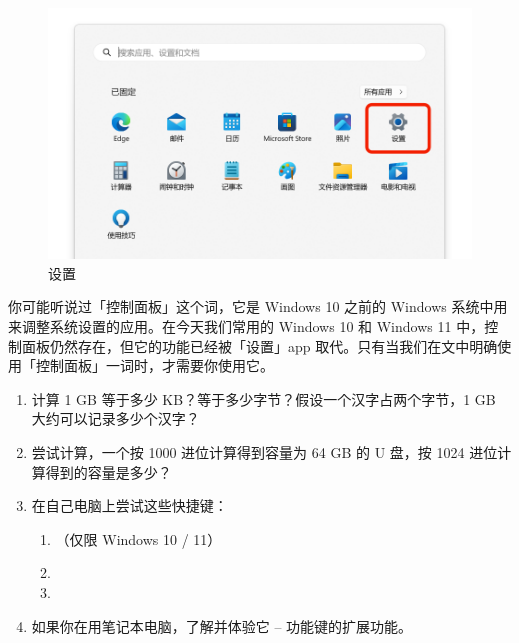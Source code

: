 \begin{figure}[htb!]
  \centering
  \includegraphics[width=.6\textwidth]{assets/basic/Settings.png}
  \caption{设置}
  \label{fig:Settings}
\end{figure}

你可能听说过「控制面板」这个词，它是 Windows 10 之前的 Windows 系统中用来调整系统设置的应用。在今天我们常用的 Windows 10 和 Windows 11 中，控制面板仍然存在，但它的功能已经被「设置」app 取代。只有当我们在文中明确使用「控制面板」一词时，才需要你使用它。

\practice

\begin{enumerate}
  \item 计算 1 GB 等于多少 KB？等于多少字节？假设一个汉字占两个字节，1 GB 大约可以记录多少个汉字？
  \item 尝试计算，一个按 1000 进位计算得到容量为 64 GB 的 U 盘，按 1024 进位计算得到的容量是多少？
  \item 在自己电脑上尝试这些快捷键：
    \begin{enumerate}
      \item {} （仅限 Windows 10 / 11）
      \item {}
      \item {}
    \end{enumerate}
  \item 如果你在用笔记本电脑，了解并体验它  --  功能键的扩展功能。
\end{enumerate}
